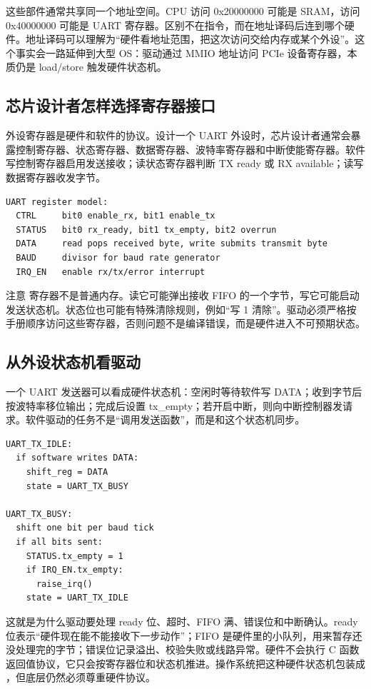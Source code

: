 这些部件通常共享同一个地址空间。CPU 访问 0x20000000 可能是 SRAM，访问 0x40000000 可能是 UART 寄存器。区别不在指令，而在地址译码后连到哪个硬件。地址译码可以理解为“硬件看地址范围，把这次访问交给内存或某个外设”。这个事实会一路延伸到大型 OS：驱动通过 MMIO 地址访问 PCIe 设备寄存器，本质仍是 load/store 触发硬件状态机。

\subsection{芯片设计者怎样选择寄存器接口}

外设寄存器是硬件和软件的协议。设计一个 UART 外设时，芯片设计者通常会暴露控制寄存器、状态寄存器、数据寄存器、波特率寄存器和中断使能寄存器。软件写控制寄存器启用发送接收；读状态寄存器判断 TX ready 或 RX available；读写数据寄存器收发字节。

\begin{lstlisting}
UART register model:
  CTRL     bit0 enable_rx, bit1 enable_tx
  STATUS   bit0 rx_ready, bit1 tx_empty, bit2 overrun
  DATA     read pops received byte, write submits transmit byte
  BAUD     divisor for baud rate generator
  IRQ_EN   enable rx/tx/error interrupt
\end{lstlisting}

注意  寄存器不是普通内存。读它可能弹出接收 FIFO 的一个字节，写它可能启动发送状态机。状态位也可能有特殊清除规则，例如“写 1 清除”。驱动必须严格按手册顺序访问这些寄存器，否则问题不是编译错误，而是硬件进入不可预期状态。

\subsection{从外设状态机看驱动}

一个 UART 发送器可以看成硬件状态机：空闲时等待软件写 DATA；收到字节后按波特率移位输出；完成后设置 tx\_empty；若开启中断，则向中断控制器发请求。软件驱动的任务不是“调用发送函数”，而是和这个状态机同步。

\begin{lstlisting}
UART_TX_IDLE:
  if software writes DATA:
    shift_reg = DATA
    state = UART_TX_BUSY

UART_TX_BUSY:
  shift one bit per baud tick
  if all bits sent:
    STATUS.tx_empty = 1
    if IRQ_EN.tx_empty:
      raise_irq()
    state = UART_TX_IDLE
\end{lstlisting}

这就是为什么驱动要处理 ready 位、超时、FIFO 满、错误位和中断确认。ready 位表示“硬件现在能不能接收下一步动作”；FIFO 是硬件里的小队列，用来暂存还没处理完的字节；错误位记录溢出、校验失败或线路异常。硬件不会执行 C 函数返回值协议，它只会按寄存器位和状态机推进。操作系统把这种硬件状态机包装成 ，但底层仍然必须尊重硬件协议。

